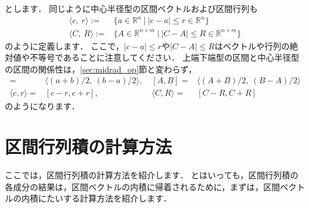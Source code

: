 とします．
同じように中心半径型の区間ベクトルおよび区間行列も
\begin{align*}
	\langle  c , ~ r \rangle :=& \{ a \in {\mathbb R}^n ~ | ~  | c - a | \le r \in {\mathbb R}^n \} \\
	\langle  C , ~ R \rangle :=& \{ A \in {\mathbb R}^{n \times m } ~ | ~  | C - A | \le R \in {\mathbb R}^{n \times m } \}
\end{align*}
のように定義します．
ここで，$| c - a | \le r $や$| C - A | \le R$はベクトルや行列の絶対値や不等号であることに注意してください．
上端下端型の区間と中心半径型の区間の関係性は，\ref{sec:midrad_op}節と変わらず，
\begin{align*}
	[a, b] =& \langle  (a + b)/2 , ~ (b - a)/2 \rangle,& ~ [A, B] =& \langle  (A + B)/2 , ~ (B - A)/2 \rangle \\
	\langle c, r \rangle =& [ c -r, c + r ] ,& ~ \langle C, R \rangle =& [ C - R, C + R ]
\end{align*}
のようになります．




%
\section{区間行列積の計算方法}
ここでは，区間行列積の計算方法を紹介します．
とはいっても，区間行列積の各成分の結果は，区間ベクトルの内積に帰着されるために，まずは，区間ベクトルの内積にたいする計算方法を紹介します．

